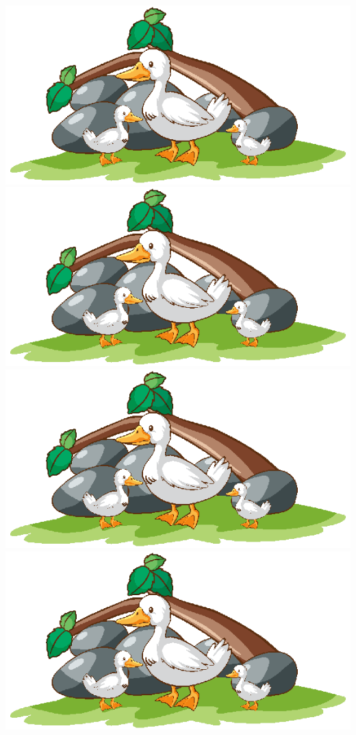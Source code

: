 \documentclass[12pt]{article}
\begin{document}
\begin{center}
	\includegraphics[scale=0.1]{figures/image1.eps} \quad
	\includegraphics[scale=0.2]{figures/image1.eps} \quad
	\includegraphics[scale=0.3]{figures/image1.eps} \quad
	\includegraphics[scale=0.4]{figures/image1.eps} \quad
\end{center}
\end{document}
